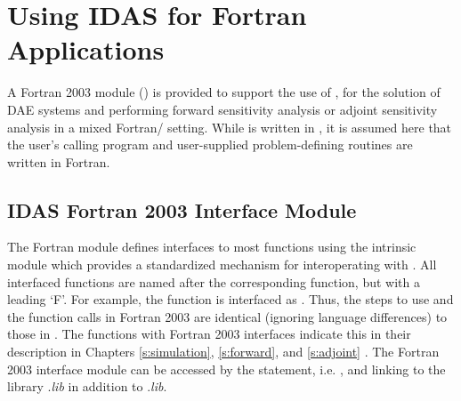 \chapter{Using IDAS for Fortran Applications}\label{s:idasfort}

A Fortran 2003 module () is provided to support the use of
{\idas}, for the solution of DAE systems and performing forward sensitivity analysis
or adjoint sensitivity analysis in a mixed Fortran/{\CC} setting. While {\idas} is
written in {\CC}, it is assumed here that the user's calling program and user-supplied
problem-defining routines are written in Fortran.


\let\sectiontype\subsection
\section{IDAS Fortran 2003 Interface Module}\label{s:idasf2003}

The  Fortran module defines interfaces to most {\idas} {\CC}
functions using the intrinsic  module which provides a
standardized mechanism for interoperating with {\CC}. All interfaced functions
are named after the corresponding {\CC} function, but with a leading `F'. For
example, the {\idas} function  is interfaced as
. Thus, the steps to use {\idas} and the function calls in
Fortran 2003 are identical (ignoring language differences) to those in {\CC}. The
{\CC} functions with Fortran 2003 interfaces indicate this in their description in
Chapters \ref{s:simulation}, \ref{s:forward}, and \ref{s:adjoint} . The Fortran
2003 {\idas} interface module can be accessed by the  statement, i.e.
, and linking to the library
.{\em lib} in addition to
.{\em lib}.


